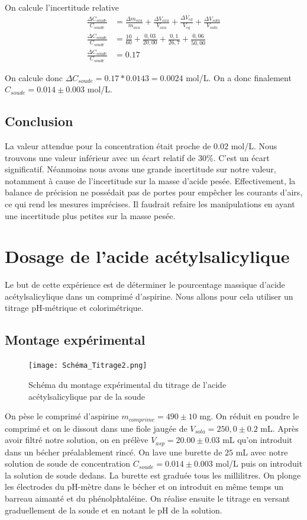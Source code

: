 \documentclass[12pt]{article}
\begin{document}
On calcule l'incertitude relative
\begin{align*}
\frac{\Delta C_{soude}}{C_{soude}}&=\frac{\Delta m_{oxa}}{ m_{oxa}} +\frac{\Delta V_{oxa}}{ V_{oxa}} + \frac{\Delta V_{eq}}{V_{eq}} + \frac{\Delta V_{soln}}{V_{soln}} \\
\frac{\Delta C_{soude}}{C_{soude}}&= \frac{10}{60} + \frac{0,03}{20,00} + \frac{0,1}{26,7} + \frac{0,06}{50,00} \\
\frac{\Delta C_{soude}}{C_{soude}}&= 0.17 
\end{align*}

On calcule donc $\Delta C_{soude}=0.17*0.0143 = 0.0024$ mol/L. On a donc finalement $C_{soude}=0.014\pm 0.003$ mol/L.

	\subsection{Conclusion}
	
La valeur attendue pour la concentration était proche de $0.02$ mol/L. Nous trouvons une valeur inférieur avec un écart relatif de 30\%. C'est un écart significatif. Néanmoins nous avons une grande incertitude sur notre valeur, notamment à cause de l'incertitude sur la masse d'acide pesée. Effectivement, la balance de précision ne possédait pas de portes pour empêcher les courants d'airs, ce qui rend les mesures imprécises. Il faudrait refaire les manipulations en ayant une incertitude plus petites sur la masse pesée. 	
	
\section{Dosage de l'acide acétylsalicylique}
Le but de cette expérience est de déterminer le pourcentage massique d'acide acétylsalicylique dans un comprimé d'aspirine. Nous allons pour cela utiliser un titrage pH-métrique et colorimétrique. 

	\subsection{Montage expérimental}
\begin{figure}[h!]
	\begin{center}
		\texttt{[image: Schéma\_Titrage2.png]}
		\label{Schéma_Titrage2}
		\caption{Schéma du montage expérimental du titrage de l'acide acétylsalicylique par de la soude}
	\end{center}
\end{figure}
On pèse le comprimé d'aspirine $m_{comprime}=490\pm 10$ mg. On réduit en poudre le comprimé et on le dissout dans une fiole jaugée de $V_{sola}=250,0\pm 0.2$ mL. Après avoir filtré notre solution, on en prélève $V_{asp}=20.00\pm 0.03$ mL qu'on introduit dans un bécher préalablement rincé. On lave une burette de $25$ mL avec notre solution de soude de concentration $C_{soude}=0.014\pm 0.003$ mol/L puis on introduit la solution de soude dedans. La burette est graduée tous les millilitres. On plonge les électrodes du pH-mètre dans le bécher et on introduit en même temps un barreau aimanté et du phénolphtaléine. On réalise ensuite le titrage en versant graduellement de la soude et en notant le pH de la solution. 
\end{document}
